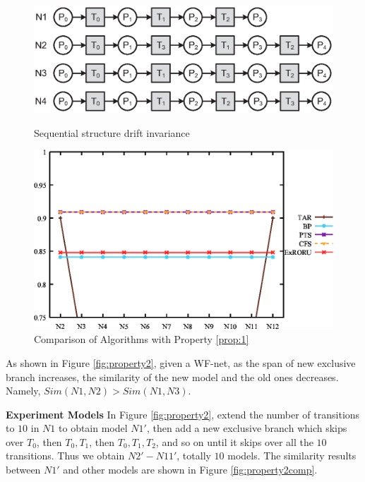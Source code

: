 \documentclass{llncs}
\begin{document}
\begin{figure}[ht]
\centering
\begin{minipage}[t]{0.45\textwidth}
	\centering
	\includegraphics[width=1\textwidth]{fig_property_1.eps}
	\caption{Sequential structure drift invariance}
	\label{fig:property1}
\end{minipage}
\hspace{0.1in}
\begin{minipage}[t]{0.45\textwidth}
	\centering
	\includegraphics[width=1\textwidth]{fig_property_1_comp.eps}
	\caption{Comparison of Algorithms with Property \ref{prop:1}}
	\label{fig:property1comp}
\end{minipage}
\end{figure}

\begin{property}\label{prop:2}
As shown in Figure \ref{fig:property2}, given a WF-net, as the span of new exclusive branch increases, the similarity of the new model and the old ones decreases. Namely, $Sim(N1,N2)>Sim(N1,N3)$.
\end{property}
\textbf{Experiment Models} In Figure \ref{fig:property2}, extend the number of transitions to $10$ in $N1$ to obtain model $N1'$, then add a new exclusive branch which skips over $T_{0}$, then $T_{0},T_{1}$, then $T_{0},T_{1},T_{2}$, and so on until it skips over all the $10$ transitions. Thus we obtain $N2'-N11'$, totally $10$ models. The similarity results between $N1'$ and other models are shown in Figure \ref{fig:property2comp}.
\end{document}
